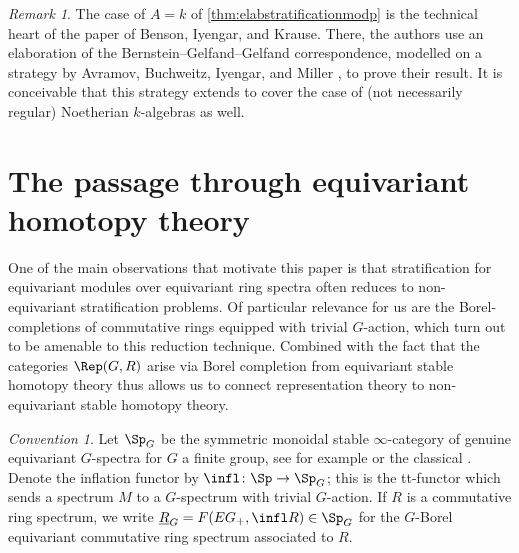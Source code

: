 \documentclass{amsart}%
\numberwithin{equation}{section}%
\newtheorem{Cor}[subsection]{Corollary}
\theoremstyle{remark}
\newtheorem{Conv}[subsection]{Convention}
\newtheorem{Rem}[subsection]{Remark}
\begin{document}

\begin{Rem}\label{rem:whygalois}
The case of $A=k$ of \cref{thm:elabstratificationmodp} is the technical heart of the paper \cite{BensonIyengarKrause11a} of Benson, Iyengar, and Krause. There, the authors use an elaboration of the Bernstein--Gelfand--Gelfand correspondence, modelled on a strategy by Avramov, Buchweitz, Iyengar, and Miller \cite{abim_bgg}, to prove their result. It is conceivable that this strategy extends to cover the case of (not necessarily regular) Noetherian $k$-algebras as well. %
\end{Rem}


\section{The passage through equivariant homotopy theory}\label{sec:eqperm}

One of the main observations that motivate this paper is that stratification for equivariant modules over equivariant ring spectra often reduces to non-equivariant stratification problems. Of particular relevance for us are the Borel-completions of commutative rings equipped with trivial $G$-action, which turn out to be amenable to this reduction technique. Combined with the fact that the categories $\Rep(G,R)$ arise via Borel completion from equivariant stable homotopy theory thus allows us to connect representation theory to non-equivariant stable homotopy theory. 

\begin{Conv}\label{conv:equivariant}
Let $\Sp_G$ be the symmetric monoidal stable $\infty$-category of genuine equivariant $G$-spectra for $G$ a finite group, see for example \cite[Part 2]{MathewNaumannNoel17} or the classical \cite{LewisMaySteinbergerMcClure86}. Denote the inflation functor by $\infl\colon \Sp \to \Sp_G$; this is the tt-functor which sends a spectrum $M$ to a $G$-spectrum with trivial $G$-action. If $R$ is a commutative ring spectrum, we write $\underline{R}_G = F(EG_+,\infl R) \in \Sp_G$ for the $G$-Borel equivariant commutative ring spectrum associated to $R$.
\end{Conv}
\end{document}
